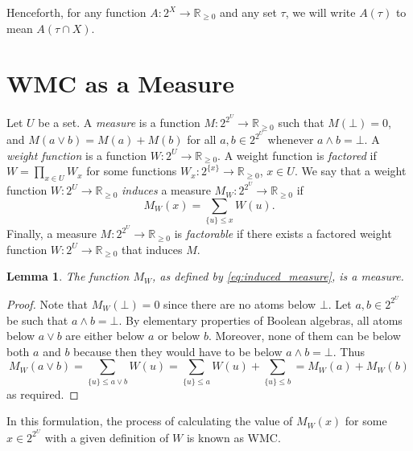 \documentclass{article}
\newtheorem{lemma}{Lemma}
\theoremstyle{definition}
\theoremstyle{remark}
\begin{document}
{Henceforth, for any function $A\colon 2^X \to \mathbb{R}_{\ge 0}$ and any set
$\tau$, we will write $A(\tau)$ to mean $A(\tau \cap X)$.

\section{WMC as a Measure}

Let $U$ be a set. A \emph{measure} is a function $M\colon 2^{2^U} \to
\mathbb{R}_{\ge 0}$ such that $M(\bot) = 0$, and $M(a \lor b) = M(a) + M(b)$ for
all $a, b \in 2^{2^U}$ whenever $a \land b = \bot$. A \emph{weight function} is
a function $W\colon 2^U \to \mathbb{R}_{\ge 0}$. A weight function is
\emph{factored} if $W = \prod_{x \in U} W_x$ for some functions $W_x\colon
2^{\{x\}} \to \mathbb{R}_{\ge 0}$, $x \in U$. We say that a weight function
$W\colon 2^U \to \mathbb{R}_{\ge 0}$ \emph{induces} a measure $M_W\colon 2^{2^U}
\to \mathbb{R}_{\ge 0}$ if
\begin{equation} \label{eq:induced_measure}
  M_W(x) = \sum_{\{u\} \le x} W(u).
\end{equation}
Finally, a measure $M\colon 2^{2^U} \to \mathbb{R}_{\ge 0}$ is \emph{factorable}
if there exists a factored weight function $W\colon 2^U \to \mathbb{R}_{\ge 0}$
that induces $M$.

\begin{lemma} \label{prop:measure}
  The function $M_W$, as defined by \cref{eq:induced_measure}, is a measure.
\end{lemma}
\begin{proof}
  Note that $M_W(\bot) = 0$ since there are no atoms below $\bot$. Let $a, b \in
  2^{2^{U}}$ be such that $a \land b = \bot$. By elementary properties of
  Boolean algebras, all atoms below $a \lor b$ are either below $a$ or below
  $b$. Moreover, none of them can be below both $a$ and $b$ because then they
  would have to be below $a \land b = \bot$. Thus
  \[
    M_W(a \lor b) = \sum_{\{u\} \le a \lor b} W(u) = \sum_{\{u\} \le a} W(u) +
    \sum_{\{u\} \le b} = M_W(a) + M_W(b)
  \]
  as required.
\end{proof}

In this formulation, the process of calculating the value of $M_W(x)$ for some
$x \in 2^{2^U}$ with a given definition of $W$ is known as WMC.

}
\end{document}
